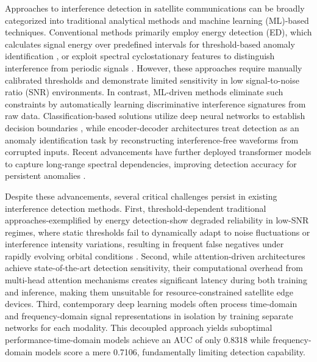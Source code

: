 \documentclass[conference]{IEEEtran}
\begin{document}
Approaches to interference detection in satellite communications can be broadly categorized into traditional analytical methods and machine learning (ML)-based techniques. Conventional methods primarily employ energy detection (ED), which calculates signal energy over predefined intervals for threshold-based anomaly identification \cite{kay2009fundamentals}, or exploit spectral cyclostationary features to distinguish interference from periodic signals \cite{experimentalCyclostationary}. However, these approaches require manually calibrated thresholds and demonstrate limited sensitivity in low signal-to-noise ratio (SNR) environments. In contrast, ML-driven methods eliminate such constraints by automatically learning discriminative interference signatures from raw data. Classification-based solutions utilize deep neural networks to establish decision boundaries \cite{pellacoSpectrumPredictionInterference2019}, while encoder-decoder architectures treat detection as an anomaly identification task by reconstructing interference-free waveforms from corrupted inputs. Recent advancements have further deployed transformer models to capture long-range spectral dependencies, improving detection accuracy for persistent anomalies \cite{saifaldawlaGenAIBasedModelsNGSO2024}.

Despite these advancements, several critical challenges persist in existing interference detection methods. First, threshold-dependent traditional approaches-exemplified by energy detection-show degraded reliability in low-SNR regimes, where static thresholds fail to dynamically adapt to noise fluctuations or interference intensity variations, resulting in frequent false negatives under rapidly evolving orbital conditions \cite{saifaldawlaGenAIBasedModelsNGSO2024}. Second, while attention-driven architectures achieve state-of-the-art detection sensitivity, their computational overhead from multi-head attention mechanisms creates significant latency during both training and inference, making them unsuitable for resource-constrained satellite edge devices. Third, contemporary deep learning models often process time-domain and frequency-domain signal representations in isolation by training separate networks for each modality. This decoupled approach yields suboptimal performance-time-domain models achieve an AUC of only 0.8318 while frequency-domain models score a mere 0.7106, fundamentally limiting detection capability.
\end{document}
